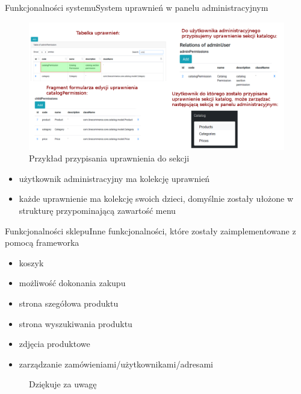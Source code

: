 \documentclass[polish,xcolor=table,9pt,aspectratio=1610,hyperref={pdfpagemode=FullScreen}]{beamer}
\begin{document}
\begin{frame}{Funkcjonalności systemu}{System uprawnień w panelu administracyjnym}
	\begin{figure}
	\begin{center}
		\includegraphics[scale=0.28]{uprawnienia.png}
	\end{center}
	\caption{{\color{black}Przykład przypisania uprawnienia do sekcji}} 
\end{figure}
\begin{itemize}
	\item<1-> użytkownik administracyjny ma kolekcję uprawnień
	\item<1-> każde uprawnienie ma kolekcję swoich dzieci, domyślnie zostały ułożone w strukturę przypominającą zawartość menu
\end{itemize}
\end{frame}

\begin{frame}{Funkcjonalności sklepu}{Inne funkcjonalności, które zostały zaimplementowane z pomocą frameworka}
\begin{itemize}
	\item<1-> koszyk
	\item<1-> możliwość dokonania zakupu
	\item<1-> strona szegółowa produktu
	\item<1-> strona wyszukiwania produktu
	\item<1-> zdjęcia produktowe
	\item<1-> zarządzanie zamówieniami/użytkownikami/adresami 
\end{itemize}
\end{frame}

\begin{frame}
\begin{figure}
	Dziękuje za uwagę
\end{figure}
\end{frame}
\end{document}
